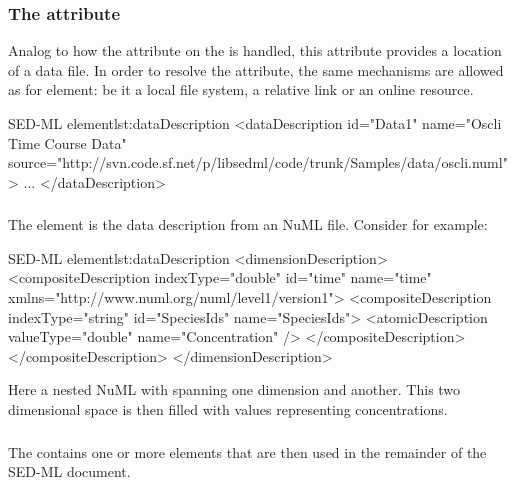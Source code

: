 \subsubsection{The  attribute}
\label{sec:sedsource}
Analog to how the  attribute on the \SedModel is handled, this attribute provides a location of a data file. In order to resolve the  attribute, the same mechanisms are allowed as for \SedModel element: be it a local file system, a relative link or an online resource.


%
\begin{myXmlLst}{SED-ML  element}{lst:dataDescription}
   <dataDescription id="Data1" name="Oscli Time Course Data" 
     source="http://svn.code.sf.net/p/libsedml/code/trunk/Samples/data/oscli.numl" >
     ...
    </dataDescription>
\end{myXmlLst} 
%

\subsubsection{}
\label{class:dimensionDescription}

The  element is the data description from an NuML file. Consider for example:

%
\begin{myXmlLst}{SED-ML  element}{lst:dataDescription}
    <dimensionDescription>
        <compositeDescription indexType="double" id="time" name="time" 
          xmlns="http://www.numl.org/numl/level1/version1">
        <compositeDescription indexType="string" id="SpeciesIds" name="SpeciesIds">
            <atomicDescription valueType="double" name="Concentration" />
        </compositeDescription>
        </compositeDescription>
    </dimensionDescription>
\end{myXmlLst} 
%

Here a nested NuML  with  spanning one dimension and  another. This two dimensional space is then filled with  values representing concentrations.

\subsubsection{}
\label{class:listOfDataSources}
The  contains one or more \SedDataSource elements that are then used in the remainder of the SED-ML document.




